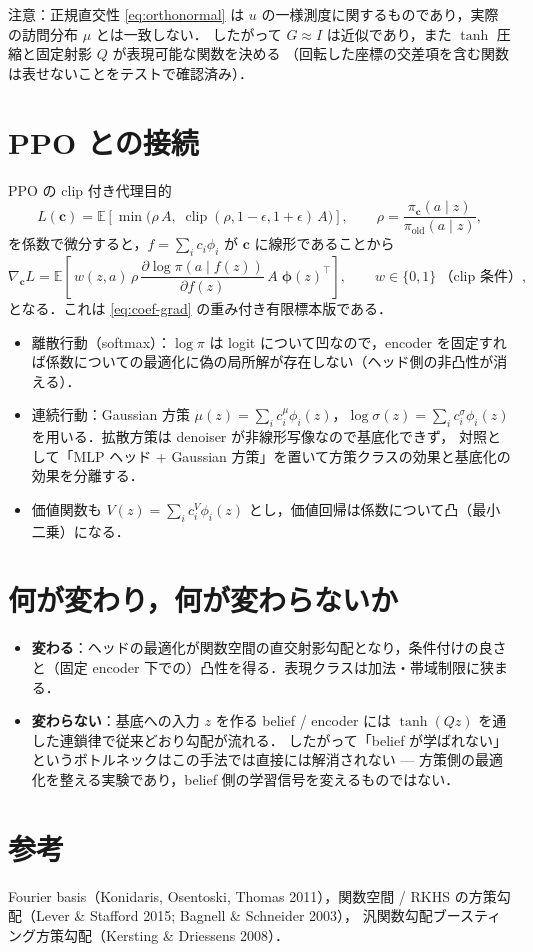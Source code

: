 \documentclass[a4paper,11pt]{article}
\begin{document}
注意：正規直交性 \eqref{eq:orthonormal} は $u$ の一様測度に関するものであり，実際の訪問分布 $\mu$ とは一致しない．
したがって $G\approx I$ は近似であり，また $\tanh$ 圧縮と固定射影 $Q$ が表現可能な関数を決める
（回転した座標の交差項を含む関数は表せないことをテストで確認済み）．

\section{PPO との接続}

PPO の clip 付き代理目的
\begin{equation}
  L(\mathbf{c}) = \mathbb{E}\!\left[\min\bigl(\rho\,A,\;\operatorname{clip}(\rho,1-\epsilon,1+\epsilon)\,A\bigr)\right],
  \qquad \rho=\frac{\pi_{\mathbf{c}}(a\mid z)}{\pi_{\mathrm{old}}(a\mid z)},
\end{equation}
を係数で微分すると，$f=\sum_i c_i\phi_i$ が $\mathbf{c}$ に線形であることから
\begin{equation}
  \nabla_{\mathbf{c}} L
  = \mathbb{E}\!\left[\, w(z,a)\,\rho\,
      \frac{\partial \log\pi(a\mid f(z))}{\partial f(z)}\, A\;\boldsymbol{\phi}(z)^{\top}\right],
  \qquad w\in\{0,1\}\ \text{（clip 条件）},
\end{equation}
となる．これは \eqref{eq:coef-grad} の重み付き有限標本版である．
\begin{itemize}
  \item 離散行動（softmax）：$\log\pi$ は logit について凹なので，encoder を固定すれば係数についての最適化に偽の局所解が存在しない（ヘッド側の非凸性が消える）．
  \item 連続行動：Gaussian 方策 $\mu(z)=\sum_i c^{\mu}_i\phi_i(z)$，$\log\sigma(z)=\sum_i c^{\sigma}_i\phi_i(z)$ を用いる．拡散方策は denoiser が非線形写像なので基底化できず，
        対照として「MLP ヘッド + Gaussian 方策」を置いて方策クラスの効果と基底化の効果を分離する．
  \item 価値関数も $V(z)=\sum_i c^{V}_i\phi_i(z)$ とし，価値回帰は係数について凸（最小二乗）になる．
\end{itemize}

\section{何が変わり，何が変わらないか}

\begin{itemize}
  \item \textbf{変わる}：ヘッドの最適化が関数空間の直交射影勾配となり，条件付けの良さと（固定 encoder 下での）凸性を得る．表現クラスは加法・帯域制限に狭まる．
  \item \textbf{変わらない}：基底への入力 $z$ を作る belief / encoder には $\tanh(Qz)$ を通した連鎖律で従来どおり勾配が流れる．
        したがって「belief が学ばれない」というボトルネックはこの手法では直接には解消されない --- 方策側の最適化を整える実験であり，belief 側の学習信号を変えるものではない．
\end{itemize}

\section*{参考}
Fourier basis（Konidaris, Osentoski, Thomas 2011），関数空間 / RKHS の方策勾配（Lever \& Stafford 2015; Bagnell \& Schneider 2003），
汎関数勾配ブースティング方策勾配（Kersting \& Driessens 2008）．
\end{document}
